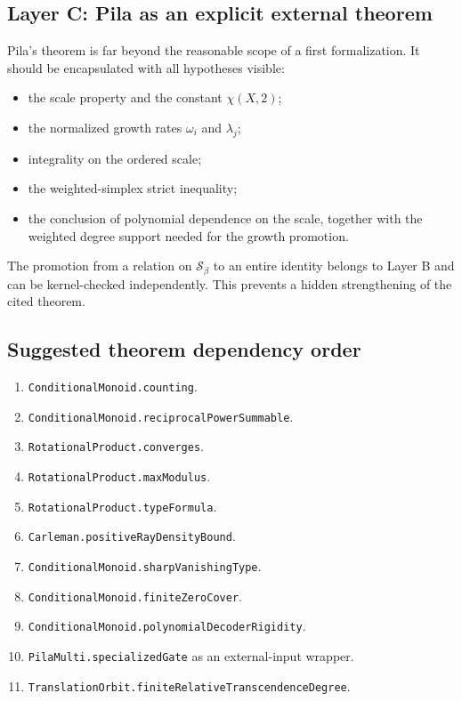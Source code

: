 \documentclass[11pt,oneside]{article}
\theoremstyle{definition}
\theoremstyle{remark}
\newcommand{\Sbeta}{\mathcal S_\beta}
\begin{document}
\subsection{Layer C: Pila as an explicit external theorem}

Pila's theorem is far beyond the reasonable scope of a first formalization.  It should be
encapsulated with all hypotheses visible:

\begin{itemize}
\item the scale property and the constant $\chi(X,2)$;
\item the normalized growth rates $\omega_i$ and $\lambda_j$;
\item integrality on the ordered scale;
\item the weighted-simplex strict inequality;
\item the conclusion of polynomial dependence on the scale, together with the weighted
degree support needed for the growth promotion.
\end{itemize}

The promotion from a relation on $\Sbeta$ to an entire identity belongs to Layer B and can
be kernel-checked independently.  This prevents a hidden strengthening of the cited theorem.

\subsection{Suggested theorem dependency order}

\begin{enumerate}
\item \texttt{ConditionalMonoid.counting}.
\item \texttt{ConditionalMonoid.reciprocalPowerSummable}.
\item \texttt{RotationalProduct.converges}.
\item \texttt{RotationalProduct.maxModulus}.
\item \texttt{RotationalProduct.typeFormula}.
\item \texttt{Carleman.positiveRayDensityBound}.
\item \texttt{ConditionalMonoid.sharpVanishingType}.
\item \texttt{ConditionalMonoid.finiteZeroCover}.
\item \texttt{ConditionalMonoid.polynomialDecoderRigidity}.
\item \texttt{PilaMulti.specializedGate} as an external-input wrapper.
\item \texttt{TranslationOrbit.finiteRelativeTranscendenceDegree}.
\end{enumerate}
\end{document}
